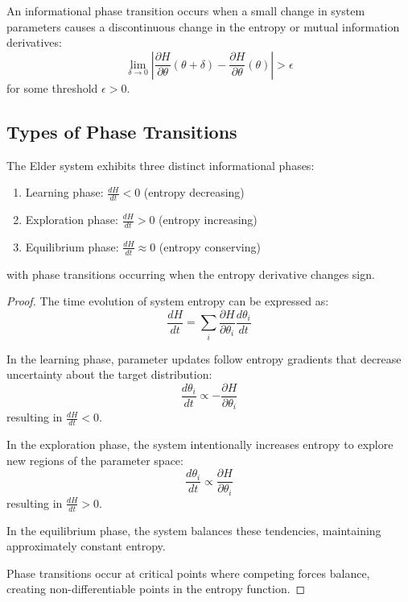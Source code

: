 \begin{definition}
An informational phase transition occurs when a small change in system parameters causes a discontinuous change in the entropy or mutual information derivatives:
\begin{equation}
\lim_{\delta \to 0} \left|\frac{\partial H}{\partial \theta}(\theta + \delta) - \frac{\partial H}{\partial \theta}(\theta)\right| > \epsilon
\end{equation}
for some threshold $\epsilon > 0$.
\end{definition}

\subsection{Types of Phase Transitions}

\begin{theorem}
The Elder system exhibits three distinct informational phases:
\begin{enumerate}
    \item Learning phase: $\frac{dH}{dt} < 0$ (entropy decreasing)
    \item Exploration phase: $\frac{dH}{dt} > 0$ (entropy increasing)
    \item Equilibrium phase: $\frac{dH}{dt} \approx 0$ (entropy conserving)
\end{enumerate}
with phase transitions occurring when the entropy derivative changes sign.
\end{theorem}

\begin{proof}
The time evolution of system entropy can be expressed as:
\begin{equation}
\frac{dH}{dt} = \sum_i \frac{\partial H}{\partial \theta_i} \frac{d\theta_i}{dt}
\end{equation}

In the learning phase, parameter updates follow entropy gradients that decrease uncertainty about the target distribution:
\begin{equation}
\frac{d\theta_i}{dt} \propto -\frac{\partial H}{\partial \theta_i}
\end{equation}
resulting in $\frac{dH}{dt} < 0$.

In the exploration phase, the system intentionally increases entropy to explore new regions of the parameter space:
\begin{equation}
\frac{d\theta_i}{dt} \propto \frac{\partial H}{\partial \theta_i}
\end{equation}
resulting in $\frac{dH}{dt} > 0$.

In the equilibrium phase, the system balances these tendencies, maintaining approximately constant entropy.

Phase transitions occur at critical points where competing forces balance, creating non-differentiable points in the entropy function.
\end{proof}

